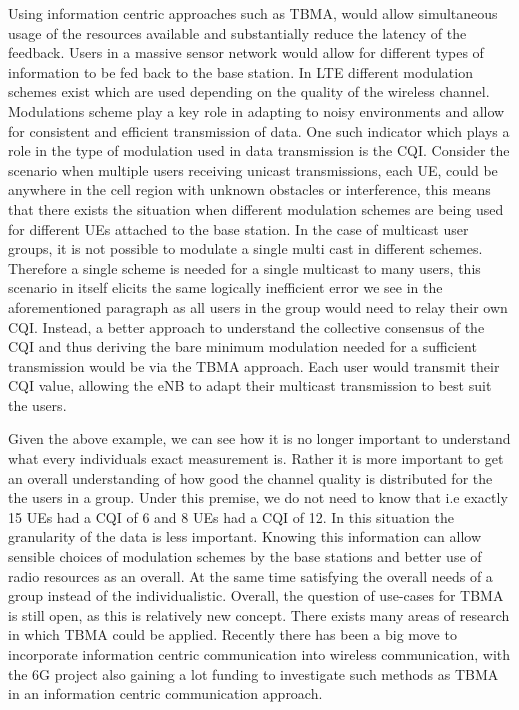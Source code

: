 \documentclass{article}
\begin{document}
Using information centric approaches such as TBMA, would allow simultaneous usage of the resources available and substantially reduce the latency of the feedback. Users in a massive sensor network would allow for different types of information to be fed back to the base station. In LTE different modulation schemes exist which are used depending on the quality of the wireless channel. Modulations scheme play a key role in adapting to noisy environments and allow for consistent and efficient transmission of data. One such indicator which plays a role in the type of modulation used in data transmission is the \ac{CQI}. Consider the scenario when multiple users receiving unicast transmissions, each UE, could be anywhere in the cell region with unknown obstacles or interference, this means that there exists the situation when different modulation schemes are being used for different UEs attached to the base station. In the case of multicast user groups, it is not possible to modulate a single multi cast in different schemes. Therefore a single scheme is needed for a single multicast to many users, this scenario in itself elicits the same logically inefficient error we see in the aforementioned paragraph as all users in the group would need to relay their own \ac{CQI}. Instead, a better approach to understand the collective consensus of the \ac{CQI} and thus deriving the bare minimum modulation needed for a sufficient transmission would be via the TBMA approach. Each user would transmit their \ac{CQI} value, allowing the \ac{eNB} to adapt their multicast transmission to best suit the users. 

Given the above example, we can see how it is no longer important to understand what every individuals exact measurement is. Rather it is more important to get an overall understanding of how good the channel quality is distributed for the the users in a group. Under this premise, we do not need to know that i.e exactly 15 UEs had a CQI of 6 and 8 UEs had a CQI of 12. In this situation the granularity of the data is less important. Knowing this information can allow sensible choices of modulation schemes by the base stations and better use of radio resources as an overall. At the same time satisfying the overall needs of a group instead of the individualistic.  Overall, the question of use-cases for TBMA is still open, as this is relatively new concept. There exists many areas of research in which \ac{TBMA} could be applied. Recently there has been a big move to incorporate information centric communication into wireless communication, with the 6G project also gaining a lot funding to investigate such methods as TBMA in an information centric communication approach. 
\end{document}
